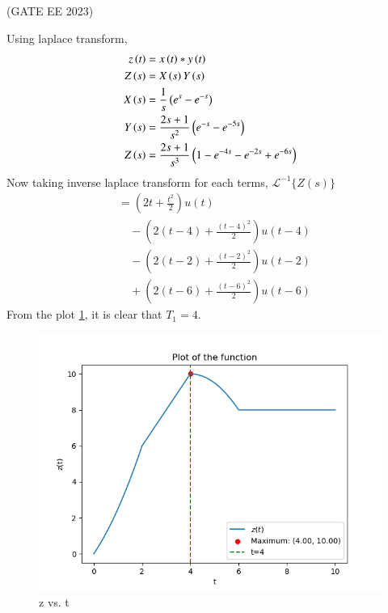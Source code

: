 \documentclass[a4,12pt,twocolumn]{IEEEtran}
\begin{document}


\hfill (GATE EE 2023)
\solution
\fi

Using laplace transform,
\begin{align}
z\left(t\right) &=x\left(t\right)*y\left(t\right)\label{eq:gate_ee_Q31.1} \\
Z\left(s\right) &=X\left(s\right)Y\left(s\right)\label{eq:gate_ee_Q31.2} \\
X\left(s\right) &= \frac{1}{s} \left(e^{s}-e^{-s}\right) \label{eq:gate_ee_Q31.3}\\
Y\left(s\right) &= \frac{2s+1}{s^2} \left(e^{-s}-e^{-5s}\right)\label{eq:gate_ee_Q31.4}\\
Z\left(s\right) &= \frac{2s+1}{s^3} \left(1-e^{-4s}-e^{-2s}+e^{-6s}\right)\label{eq:gate_ee_Q31.5}
\end{align}
Now taking inverse laplace transform for each terms, $\mathscr{L^{-1}} \{Z(s)\}$
\begin{align}
&= \left( 2t + \frac{t^2}{2} \right) u(t) \nonumber \\
&\quad - \left( 2(t-4) + \frac{(t-4)^2}{2} \right)u(t-4) \nonumber \\
&\quad - \left( 2(t-2) + \frac{(t-2)^2}{2} \right)u(t-2) \nonumber \\
&\quad + \left( 2(t-6) + \frac{(t-6)^2}{2} \right)u(t-6) \nonumber
\end{align}\label{eq:gate_ee_Q31.6}
From the plot \ref{fig:gate2023EE1}, it is clear that $T_1=4$.\\
\begin{figure}[h]
\centering
   \includegraphics[width=1\linewidth]{2023/EE/31/figs/figs/gate2023EE.png}
   \caption{z vs. t}
   \label{fig:gate2023EE1}
 \end{figure}\\
\end{document}
